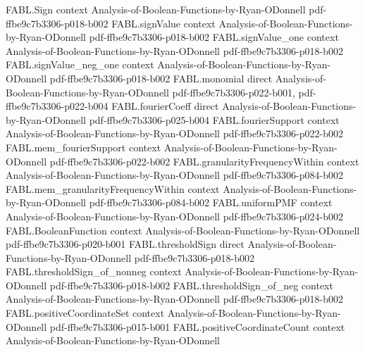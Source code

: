 \begin{theorem}
\label{FABL.correlatedPairPMF_map_swap}
\leanok
{}
\proofstep
  {FABL.Sign}
  {context}
  {Analysis-of-Boolean-Functions-by-Ryan-ODonnell}
  {pdf-ffbe9c7b3306-p018-b002}
\proofstep
  {FABL.signValue}
  {context}
  {Analysis-of-Boolean-Functions-by-Ryan-ODonnell}
  {pdf-ffbe9c7b3306-p018-b002}
\proofstep
  {FABL.signValue_one}
  {context}
  {Analysis-of-Boolean-Functions-by-Ryan-ODonnell}
  {pdf-ffbe9c7b3306-p018-b002}
\proofstep
  {FABL.signValue_neg_one}
  {context}
  {Analysis-of-Boolean-Functions-by-Ryan-ODonnell}
  {pdf-ffbe9c7b3306-p018-b002}
\proofstep
  {FABL.monomial}
  {direct}
  {Analysis-of-Boolean-Functions-by-Ryan-ODonnell}
  {pdf-ffbe9c7b3306-p022-b001,
    pdf-ffbe9c7b3306-p022-b004}
\proofstep
  {FABL.fourierCoeff}
  {direct}
  {Analysis-of-Boolean-Functions-by-Ryan-ODonnell}
  {pdf-ffbe9c7b3306-p025-b004}
\proofstep
  {FABL.fourierSupport}
  {context}
  {Analysis-of-Boolean-Functions-by-Ryan-ODonnell}
  {pdf-ffbe9c7b3306-p022-b002}
\proofstep
  {FABL.mem_fourierSupport}
  {context}
  {Analysis-of-Boolean-Functions-by-Ryan-ODonnell}
  {pdf-ffbe9c7b3306-p022-b002}
\proofstep
  {FABL.granularityFrequencyWithin}
  {context}
  {Analysis-of-Boolean-Functions-by-Ryan-ODonnell}
  {pdf-ffbe9c7b3306-p084-b002}
\proofstep
  {FABL.mem_granularityFrequencyWithin}
  {context}
  {Analysis-of-Boolean-Functions-by-Ryan-ODonnell}
  {pdf-ffbe9c7b3306-p084-b002}
\proofstep
  {FABL.uniformPMF}
  {context}
  {Analysis-of-Boolean-Functions-by-Ryan-ODonnell}
  {pdf-ffbe9c7b3306-p024-b002}
\proofstep
  {FABL.BooleanFunction}
  {context}
  {Analysis-of-Boolean-Functions-by-Ryan-ODonnell}
  {pdf-ffbe9c7b3306-p020-b001}
\proofstep
  {FABL.thresholdSign}
  {direct}
  {Analysis-of-Boolean-Functions-by-Ryan-ODonnell}
  {pdf-ffbe9c7b3306-p018-b002}
\proofstep
  {FABL.thresholdSign_of_nonneg}
  {context}
  {Analysis-of-Boolean-Functions-by-Ryan-ODonnell}
  {pdf-ffbe9c7b3306-p018-b002}
\proofstep
  {FABL.thresholdSign_of_neg}
  {context}
  {Analysis-of-Boolean-Functions-by-Ryan-ODonnell}
  {pdf-ffbe9c7b3306-p018-b002}
\proofstep
  {FABL.positiveCoordinateSet}
  {context}
  {Analysis-of-Boolean-Functions-by-Ryan-ODonnell}
  {pdf-ffbe9c7b3306-p015-b001}
\proofstep
  {FABL.positiveCoordinateCount}
  {context}
  {Analysis-of-Boolean-Functions-by-Ryan-ODonnell}

\end{theorem}
